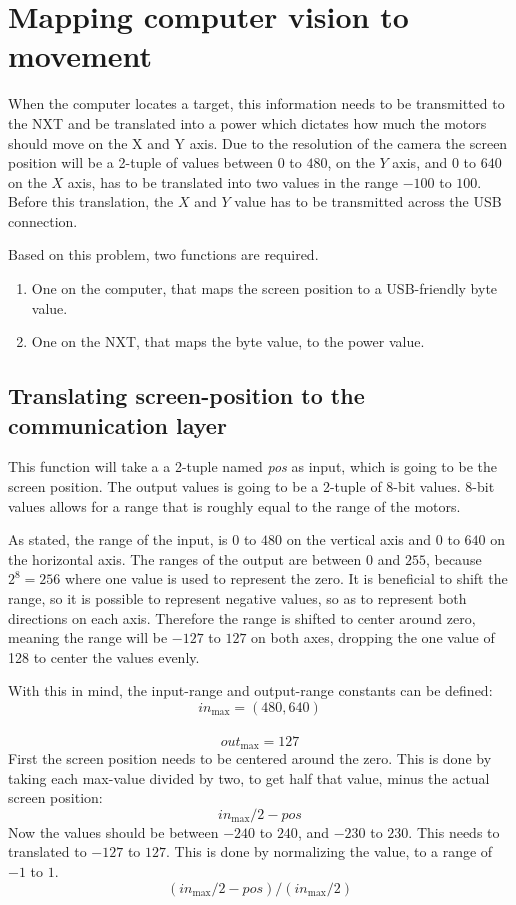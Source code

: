 \section{Mapping computer vision to movement}\label{sec:mappingcompvis}
When the computer locates a target, this information needs to be transmitted to the NXT and be translated into a power which dictates how much the motors should move on the X and Y axis.
Due to the resolution of the camera the screen position will be a 2-tuple of values between $0$ to $480$, on the $Y$ axis, and $0$ to $640$ on the $X$ axis, has to be translated into two values in the range $-100$ to $100$.
Before this translation, the $X$ and $Y$ value has to be transmitted across the USB connection.

Based on this problem, two functions are required.
\begin{enumerate}
	\item One on the computer, that maps the screen position to a USB-friendly byte value.
	\item One on the NXT, that maps the byte value, to the power value.
\end{enumerate}

\subsection{Translating screen-position to the communication layer}
This function will take a a 2-tuple named \textit{pos} as input, which is going to be the screen position.
The output values is going to be a 2-tuple of 8-bit values.
8-bit values allows for a range that is roughly equal to the range of the motors.

As stated, the range of the input, is $0$ to $480$ on the vertical axis and $0$ to $640$ on the horizontal axis.
The ranges of the output are between $0$ and $255$, because $2^8 = 256$ where one value is used to represent the zero.
It is beneficial to shift the range, so it is possible to represent negative values, so as to represent both directions on each axis.
Therefore the range is shifted to center around zero, meaning the range will be $-127$ to $127$ on both axes, dropping the one value of 128 to center the values evenly.

With this in mind, the input-range and output-range constants can be defined:\\
$$in_\text{max} = (480,640)$$\\
$$out_\text{max} = 127$$
First the screen position needs to be centered around the zero.
This is done by taking each max-value divided by two, to get half that value, minus the actual screen position:
$$
in_\text{max}/2 - pos
$$
Now the values should be between $-240$ to $240$, and $-230$ to $230$.
This needs to translated to $-127$ to $127$.
This is done by normalizing the value, to a range of $-1$ to $1$.
$$
(in_\text{max}/2 - pos)/(in_\text{max}/2)
$$

